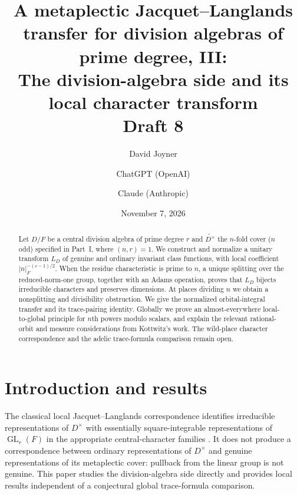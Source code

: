 \documentclass[11pt]{article}
\title{A metaplectic Jacquet--Langlands transfer for division algebras of prime degree, III:\\
The division-algebra side and its local character transform\\[0.4em]\normalsize Draft 8}
\author{David Joyner \and ChatGPT (OpenAI) \and Claude (Anthropic)}
\date{November 7, 2026}
\newcommand{\GL}{\operatorname{GL}}
\theoremstyle{plain}
\theoremstyle{definition}
\begin{document}
\maketitle
\begin{abstract}
Let $D/F$ be a central division algebra of prime degree $r$ and
$\widetilde{D^\times}$ the $n$-fold cover ($n$ odd) specified in
Part~I, where $(n,r)=1$. We construct and normalize a unitary
transform $L_D$ of genuine and ordinary invariant class functions,
with local coefficient $|n|_F^{-(r-1)/2}$. When the residue characteristic
is prime to $n$, a unique splitting over the reduced-norm-one group,
together with an Adams operation, proves that $L_D$ bijects irreducible
characters and preserves dimensions. At places dividing $n$ we obtain
a nonsplitting and divisibility obstruction. We give the normalized
orbital-integral transfer and its trace-pairing identity. Globally we
prove an almost-everywhere local-to-global principle for $n$th powers
modulo scalars, and explain the relevant rational-orbit and measure
considerations from Kottwitz's work. The wild-place character
correspondence and the adelic trace-formula comparison remain open.
\end{abstract}
\tableofcontents

\section{Introduction and results}
The classical local Jacquet--Langlands correspondence identifies
irreducible representations of $D^\times$ with essentially
square-integrable representations of $\GL_r(F)$ in the appropriate
central-character families \cite{DKV}. It does not produce a
correspondence between ordinary representations of $D^\times$ and
genuine representations of its metaplectic cover: pullback from the
linear group is not genuine. This paper studies the division-algebra
side directly and provides local results independent of a conjectural
global trace-formula comparison.
\end{document}

